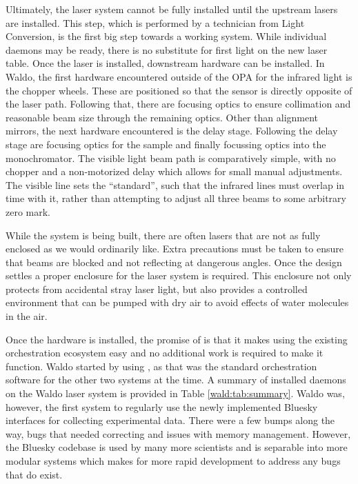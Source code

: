 Ultimately, the laser system cannot be fully installed until the upstream lasers are installed.
This step, which is performed by a technician from Light Conversion, is the first big step towards a working system.
While individual daemons may be ready, there is no substitute for first light on the new laser table.
Once the laser is installed, downstream hardware can be installed.
In Waldo, the first hardware encountered outside of the OPA for the infrared light is the chopper wheels.
These are positioned so that the sensor is directly opposite of the laser path.
Following that, there are focusing optics to ensure collimation and reasonable beam size through the remaining optics.
Other than alignment mirrors, the next hardware encountered is the delay stage.
Following the delay stage are focusing optics for the sample and finally focussing optics into the monochromator.
The visible light beam path is comparatively simple, with no chopper and a non-motorized delay which allows for small manual adjustments.
The visible line sets the ``standard'', such that the infrared lines must overlap in time with it, rather than attempting to adjust all three beams to some arbitrary zero mark.

While the system is being built, there are often lasers that are not as fully enclosed as we would ordinarily like.
Extra precautions must be taken to ensure that beams are blocked and not reflecting at dangerous angles.
Once the design settles a proper enclosure for the laser system is required.
This enclosure not only protects from accidental stray laser light, but also provides a controlled environment that can be pumped with dry air to avoid effects of water molecules in the air.

Once the hardware is installed, the promise of \yaq{} is that it makes using the existing orchestration ecosystem easy and no additional work is required to make it function.
Waldo started by using \yaqccmds{}, as that was the standard orchestration software for the other two systems at the time.
A summary of installed \yaq{} daemons on the Waldo laser system is provided in Table \ref{wald:tab:summary}.
Waldo was, however, the first system to regularly use the newly implemented Bluesky interfaces for collecting experimental data.
There were a few bumps along the way, bugs that needed correcting and issues with memory management.
However, the Bluesky codebase is used by many more scientists and is separable into more modular systems which makes for more rapid development to address any bugs that do exist.

